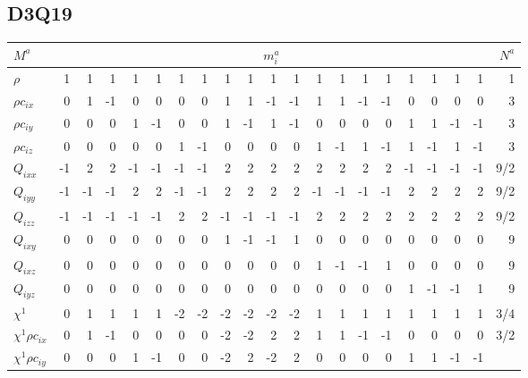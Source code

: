 \subsection{D3Q19}

\begin{table}
\begin{tabular}{|l||r|rrrrrr|rrrr|rrrr|rrrr|r||}
\hline\hline
$M^a$ & \multicolumn{19}{c||}{$m_i^a$} & $N^a$\\
\hline
$\rho $ & 1 &  1 &  1 &  1 &  1 &  1 &  1 & 
         1 &  1 &  1 &   1 &  1 &  1 &  1 & 1 & 1 & 1 & 1 & 1
& 1\\
\hline
$\rho c_{ix}$ & 0 &  1 &  -1 &  0 &  0 &  0 &  0 & 
         1 &  1 &  -1 &   -1 &  1 &  1 &  -1 & -1 & 0 & 0 & 0 & 0
& 3 \\
\hline
$\rho c_{iy}$ & 0 &  0 &  0 &  1 &  -1 &  0 &  0 & 
         1 &  -1 &  1 &   -1 &  0 &  0 &  0 & 0 & 1 & 1 & -1 & -1
& 3\\
\hline
$\rho c_{iz}$ & 0 &  0 &  0 &  0 &  0 &  1 &  -1 & 
         0 &  0 &  0 &   0 &  1 &  -1 &  1 & -1 & 1 & -1 & 1 & -1
& 3\\
\hline
$Q_{ixx}$ & -1 &  2 &  2 &  -1&  -1 &  -1 &  -1 & 
         2 &  2 &  2 &   2 &  2 &  2 &  2 & 2 & -1 & -1 & -1 & -1
& 9/2\\
\hline
$Q_{iyy}$ & -1 &  -1 &  -1 &  2&  2 &  -1 &  -1 & 
         2 &  2 &  2 &   2 &  -1 &  -1 &  -1 & -1 & 2 & 2 & 2 & 2
& 9/2\\
\hline
$Q_{izz}$ & -1 &  -1 &  -1 &  -1&  -1 &  2 &  2 & 
         -1 &  -1 &  -1 &   -1 &  2 &  2 & 2 & 2 & 2 & 2 & 2 & 2
& 9/2\\
\hline
$Q_{ixy}$ & 0 &  0 &  0 &  0&  0 &  0 &  0 & 
          1 &  -1 &  -1 &    1 &  0 &  0 & 0 & 0 & 0 & 0 & 0 & 0
& 9\\
\hline
$Q_{ixz}$ & 0 &  0 &  0 &  0&  0 &  0 &  0 & 
          0 &   0 &   0 &   0 &  1 & -1 & -1 & 1 & 0 & 0 & 0 & 0
& 9\\
\hline
$Q_{iyz}$ & 0 &  0 &  0 &  0&  0 &  0 &  0 & 
          0 &   0 &   0 &   0 &  0 & 0 & 0 & 0 & 1 & -1 & -1 & 1
& 9\\
\hline\hline
$\chi^1$ & 0 &  1 &  1 &  1 &  1 &  -2 &  -2 & 
         -2 &  -2 &  -2 &  -2 &  1 &  1 & 1 & 1 & 1 & 1 & 1 & 1
& 3/4\\
\hline
$\chi^1 \rho c_{ix}$ & 0 &  1 &  -1 &  0&  0 &  0 &  0 & 
         -2 &  -2 &  2 &  2 &  1 &  1 & -1 & -1 & 0 & 0 & 0 & 0
& 3/2\\
\hline
$\chi^1 \rho c_{iy}$ & 0 &  0 &  0 &  1&  -1 &  0 &  0 & 
         -2 &  2 &  -2 &  2 &  0 &  0 & 0 & 0 & 1 & 1 & -1 & -1

\end{tabular}
\end{table}
